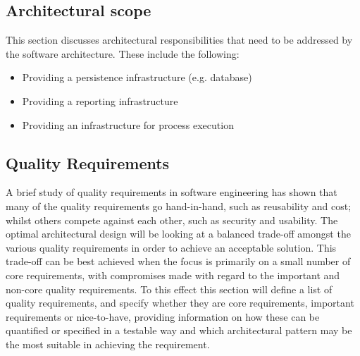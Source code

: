 \documentclass[a4paper]{article}
\begin{document}
\subsection{Architectural scope}
This section discusses architectural responsibilities that need to be addressed by the software
architecture. These include the following:

\begin{itemize}
\item Providing a persistence infrastructure (e.g. database)
\item Providing a reporting infrastructure
\item Providing an infrastructure for process execution
\end{itemize}

\subsection{Quality Requirements}
A brief study of quality requirements in software engineering has shown that many of the quality requirements go hand-in-hand, such as reusability and cost; whilst others compete against each other, such as security and usability. The optimal architectural design will be looking at a balanced trade-off amongst the various quality requirements in order to achieve an acceptable solution.  This trade-off can be best achieved when the focus is primarily on a small number of core requirements, with compromises made with regard to the important and non-core quality requirements. To this effect this section will define a list of quality requirements, and specify whether they are core requirements, important requirements or nice-to-have, providing information on how these can be quantified or specified in a testable way and which architectural pattern may be the most suitable in achieving the requirement.
\end{document}
